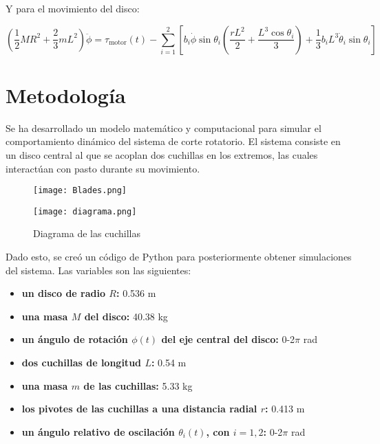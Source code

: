\documentclass[12pt]{article}
\begin{document}
	Y para el movimiento del disco:

	\begin{equation} (\frac{1}{2}MR^2 + \frac{2}{3}mL^2)\ddot{\phi} = \tau_{\text{motor}}(t) - \sum_{i=1}^{2} [b_i \dot{\phi} \sin{\theta_i} \left(\frac{rL^2}{2} + \frac{L^3\cos{\theta_i}}{3}\right) + \frac{1}{3}b_i L^3 \dot{\theta}_i \sin{\theta_i}] \end{equation}
	

\section{Metodología}

Se ha desarrollado un modelo matemático y computacional para simular el comportamiento dinámico del sistema de corte rotatorio. El sistema consiste en un disco central al que se acoplan dos cuchillas en los extremos, las cuales interactúan con pasto durante su movimiento. 

\begin{figure}[H]
    \centering
    \begin{minipage}[b]{0.4\textwidth}
    \texttt{[image: Blades.png]}
  \end{minipage}
  \hfill
  \begin{minipage}[b]{0.4\textwidth}
    \texttt{[image: diagrama.png]}
  \end{minipage}
    \caption{Diagrama de las cuchillas}
    \label{fig:enter-label}
\end{figure}

Dado esto, se creó un código de Python para posteriormente obtener simulaciones del sistema. Las variables son las siguientes: 

\begin{itemize}
    \item \textbf{un disco de radio $R$:} 0.536 m
    \item \textbf{una masa $M$ del disco:} 40.38 kg  
    \item \textbf{un ángulo de rotación $\phi(t)$ del eje central del disco:} 0-2$\pi$ rad
    \item \textbf{dos cuchillas de longitud $L$:} 0.54 m
    \item \textbf{una masa $m$ de las cuchillas:} 5.33 kg
    \item \textbf{los pivotes de las cuchillas a una distancia radial $r$:} 0.413 m
    \item \textbf{un ángulo relativo de oscilación $\theta_i(t)$, con $i = 1, 2$:} 0-2$\pi$ rad
\end{itemize}
\end{document}

